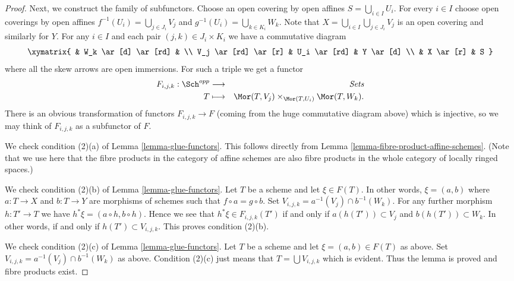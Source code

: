 \begin{proof}
\medskip\noindent
Next, we construct the family of subfunctors.
Choose an open covering by open affines
$S = \bigcup\nolimits_{i \in I} U_i$.
For every $i \in I$ choose open coverings by open affines
$f^{-1}(U_i) = \bigcup\nolimits_{j \in J_i} V_j$ and
$g^{-1}(U_i) = \bigcup\nolimits_{k \in K_i} W_k$.
Note that $X = \bigcup_{i \in I} \bigcup_{j \in J_i} V_j$
is an open covering and similarly for $Y$.
For any $i \in I$ and each pair $(j, k) \in J_i \times K_i$
we have a commutative diagram
$$
\xymatrix{
    & W_k \ar[d] \ar[rd] &   \\
V_j \ar[rd] \ar[r] & U_i \ar[rd] & Y \ar[d] \\
    & X \ar[r]  & S
}
$$
where all the skew arrows are open immersions. For such a
triple we get a functor
\begin{eqnarray*}
F_{i, j, k} : \Sch^{opp} & \longrightarrow & \textit{Sets} \\
T & \longmapsto &
\Mor(T, V_j) \times_{\Mor(T, U_i)} \Mor(T, W_k).
\end{eqnarray*}
There is an obvious transformation of functors $F_{i, j, k} \to F$
(coming from the huge commutative diagram above)
which is injective, so we may think of $F_{i, j, k}$ as a subfunctor
of $F$.

\medskip\noindent
We check condition (2)(a) of Lemma \ref{lemma-glue-functors}.
This follows directly from Lemma \ref{lemma-fibre-product-affine-schemes}.
(Note that we use here that the fibre products in the category of
affine schemes are also fibre products in the whole category of locally
ringed spaces.)

\medskip\noindent
We check condition (2)(b) of Lemma \ref{lemma-glue-functors}.
Let $T$ be a scheme and let $\xi \in F(T)$. In other words,
$\xi = (a, b)$ where $a : T \to X$ and $b : T \to Y$ are
morphisms of schemes such that $f \circ a = g \circ b$.
Set $V_{i, j, k} = a^{-1}(V_j) \cap b^{-1}(W_k)$. For any
further morphism $h : T' \to T$ we have
$h^*\xi = (a \circ h, b \circ h)$. Hence we see that
$h^*\xi \in F_{i, j, k}(T')$ if and only if
$a(h(T')) \subset V_j$ and $b(h(T')) \subset W_k$.
In other words, if and only if $h(T') \subset V_{i, j, k}$.
This proves condition (2)(b).

\medskip\noindent
We check condition (2)(c) of Lemma \ref{lemma-glue-functors}.
Let $T$ be a scheme and let $\xi = (a, b) \in F(T)$ as above.
Set $V_{i, j, k} = a^{-1}(V_j) \cap b^{-1}(W_k)$ as above.
Condition (2)(c) just means that $T = \bigcup V_{i, j, k}$
which is evident. Thus the lemma is proved and fibre products
exist.
\end{proof}

